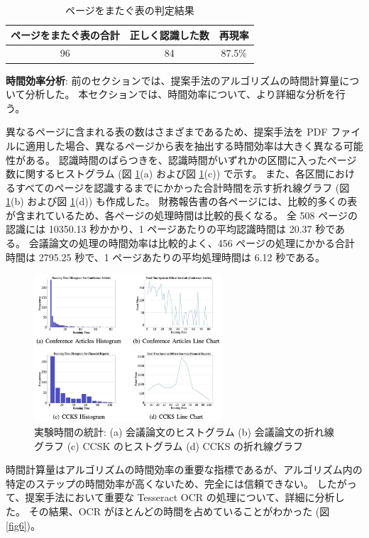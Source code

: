 \documentclass[uplatex, twocolumn,10pt]{jsarticle}
\begin{document}
\begin{table}[tp]
    \centering
    \caption{ページをまたぐ表の判定結果}
    \label{table3}
    \begin{tabular}{ccc}
        ページをまたぐ表の合計 & 正しく認識した数 & 再現率 \\
        \toprule
        96 & 84 & 87.5\% \\
    \end{tabular}
\end{table}

\textbf{時間効率分析}:
前のセクションでは、提案手法のアルゴリズムの時間計算量について分析した。
本セクションでは、時間効率について、より詳細な分析を行う。

異なるページに含まれる表の数はさまざまであるため、提案手法を PDF ファイルに適用した場合、異なるページから表を抽出する時間効率は大きく異なる可能性がある。
認識時間のばらつきを、認識時間がいずれかの区間に入ったページ数に関するヒストグラム (図 \ref{fig5}(a) および図 \ref{fig5}(c)) で示す。
また、各区間におけるすべてのページを認識するまでにかかった合計時間を示す折れ線グラフ (図 \ref{fig5}(b) および図 \ref{fig5}(d)) も作成した。
財務報告書の各ページには、比較的多くの表が含まれているため、各ページの処理時間は比較的長くなる。
全 508 ページの認識には 10350.13 秒かかり、1 ページあたりの平均認識時間は 20.37 秒である。
会議論文の処理の時間効率は比較的よく、456 ページの処理にかかる合計時間は 2795.25 秒で、1 ページあたりの平均処理時間は 6.12 秒である。

\begin{figure}[tp]
    \begin{center}
        \includegraphics*[width=7cm]{image/master/master2/Fig5.png}
        \caption{実験時間の統計: (a) 会議論文のヒストグラム (b) 会議論文の折れ線グラフ (c) CCSK のヒストグラム (d) CCKS の折れ線グラフ}
        \label{fig5}
    \end{center}
\end{figure}

時間計算量はアルゴリズムの時間効率の重要な指標であるが、アルゴリズム内の特定のステップの時間効率が高くないため、完全には信頼できない。
したがって、提案手法において重要な Tesseract OCR の処理について、詳細に分析した。
その結果、OCR がほとんどの時間を占めていることがわかった (図 \ref{fig6})。
\end{document}
